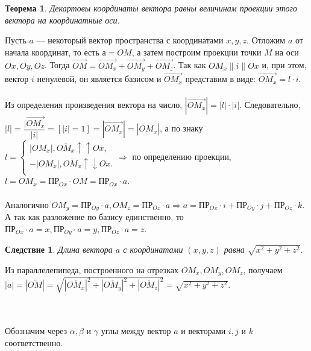 \newtheorem*{th2_3_1}{Теорема}\begin{th2_3_1}Декартовы координаты вектора равны величинам проекции этого вектора на координатные
	оси.
\end{th2_3_1}\begin{Proof}
	Пусть $a$ --- некоторый вектор пространства с координатами $x, y, z$. Отложим $a$ от начала координат, то есть $а = OM$, а затем построим проекции точки $M$ на оси $Ox, Oy, Oz$. Тогда $\overrightarrow{OM} = \overrightarrow{OM_x} + \overrightarrow{OM_y} + \overrightarrow{OM_z}$. Так как $OM_x \parallel i \parallel Ox$ и, при этом, вектор $i$ ненулевой, он является базисом и $\overrightarrow{OM_x}$ представим в виде: $\overrightarrow{OM_x} = l\cdot i$.\\\\
	Из определения произведения вектора на число, $|\overrightarrow{OM_x}| = |l|\cdot|i|$. Следовательно, $|l| = \dfrac{|\overrightarrow{OM_x}}{|i|} = [|i| = 1] = |\overrightarrow{OM_x}| = |\overline{OM_x}|$, а по знаку $l = \begin{cases}
		|OM_x|, \overline{OM_x} \uparrow\uparrow Ox,\\
		-|OM_x|, \overline{OM_x} \uparrow\downarrow Ox.\\
	\end{cases}\Rightarrow$ по определению проекции, $l = OM_x = \text{ПР}_{Ox}\cdot OM = \text{ПР}_{Ox}\cdot a$.\\\\
	Аналогично $OM_y = \text{ПР}_{Oy}\cdot a, OM_z = \text{ПР}_{Oz}\cdot a\Rightarrow a = \text{ПР}_{Ox}\cdot i + \text{ПР}_{Oy}\cdot j + \text{ПР}_{Oz}\cdot k$. А так как разложение по базису единственно, то $\text{ПР}_{Ox}\cdot a = x, \text{ПР}_{Oy}\cdot a = y, \text{ПР}_{Oz}\cdot a = z$.
\end{Proof}
\newtheorem*{cor2_3_1}{Следствие}\begin{cor2_3_1}Длина вектора $a$ с координатами $(x, y, z)$ равна $\sqrt{x^2 + y^2 + z^2}$.
\end{cor2_3_1}\begin{Proof}
	Из параллелепипеда, построенного на отрезках $OM_x, OM_y, OM_z$, получаем $|a| = |\overline{OM}| = \sqrt{|\overline{OM_x}|^2 + |\overline{OM_y}|^2 + |\overline{OM_z}|^2} = \sqrt{x^2 + y^2 + z^2}$.
\end{Proof}\\\\
Обозначим через $\alpha, \beta$ и $\gamma$ углы между вектор $a$ и векторами $i, j$ и $k$ соответственно.\\\\
